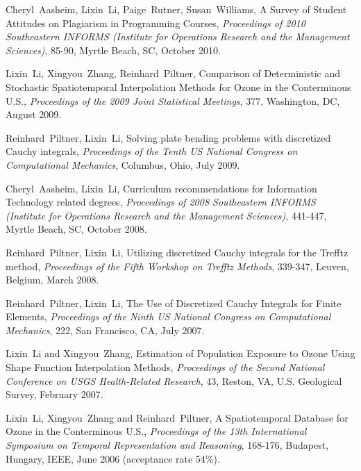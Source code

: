 \documentclass[10pt]{article}
\begin{document}
\begin{bibenum}
\item Cheryl~Aasheim, Lixin~Li, Paige~Rutner, Susan~Williams, 
A Survey of Student Attitudes on Plagiarism in Programming Courses, 
{\it Proceedings of 2010 Southeastern INFORMS (Institute for Operations 
Research and the Management Sciences)}, 85-90, Myrtle Beach, SC, 
October 2010.

\item Lixin~Li, Xingyou~Zhang, Reinhard~Piltner, Comparison of Deterministic 
and Stochastic Spatiotemporal Interpolation Methods for Ozone in the 
Conterminous U.S., {\it Proceedings of the 2009 Joint Statistical Meetings}, 
377, Washington, DC, August 2009.

\item Reinhard~Piltner, Lixin~Li, Solving plate bending problems with 
discretized Cauchy integrals, {\it Proceedings of the Tenth US National 
Congress on Computational Mechanics}, Columbus, Ohio, July 2009.

\item Cheryl~Aasheim, Lixin~Li, Curriculum recommendations for 
Information Technology related degrees, {\it Proceedings of 2008 
Southeastern INFORMS (Institute for Operations Research and 
the Management Sciences)}, 441-447, Myrtle Beach, SC, October 2008.

\item Reinhard~Piltner, Lixin~Li, Utilizing discretized Cauchy
integrals for the Trefftz method, {\it Proceedings of the Fifth
Workshop on Trefftz Methods}, 339-347, Leuven, Belgium, March 2008.

\item Reinhard~Piltner, Lixin~Li, The Use of Discretized Cauchy
Integrals for Finite Elements, {\it Proceedings of the Ninth US
National Congress on Computational Mechanics}, 222, San Francisco, CA,
July 2007.

\item Lixin~Li and Xingyou~Zhang, Estimation of Population
Exposure to Ozone Using Shape Function Interpolation Methods, {\it
Proceedings of the Second National Conference on USGS
Health-Related Research}, 43, Reston, VA, U.S. Geological Survey,
February 2007.

\item Lixin~Li, Xingyou~Zhang and Reinhard~Piltner, A
Spatiotemporal Database for Ozone in the Conterminous U.S., {\it
Proceedings of the 13th International Symposium on Temporal
Representation and Reasoning}, 168-176, Budapest, Hungary, IEEE,
June 2006 (acceptance rate 54\%).


\end{bibenum}
\end{document}
